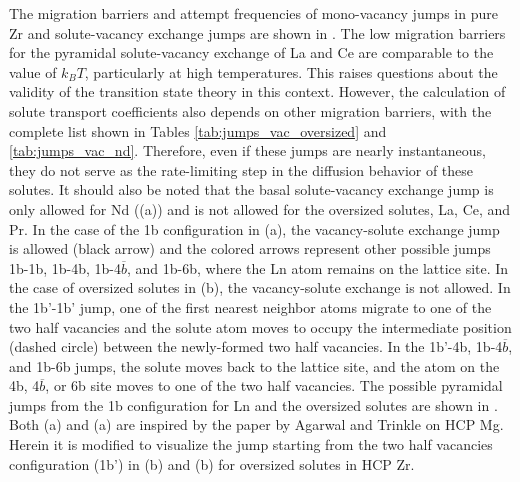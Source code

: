 \documentclass[preprint,12pt]{elsarticle}
\begin{document}
The migration barriers and attempt frequencies of mono-vacancy jumps in pure Zr and solute-vacancy exchange jumps are shown in . 
The low migration barriers for the pyramidal solute-vacancy exchange of La and Ce are comparable to the value of $k_B$$T$, particularly at high temperatures. This raises questions about the validity of the transition state theory in this context. However, the calculation of solute transport coefficients also depends on other migration barriers, with the complete list shown in Tables \ref{tab:jumps_vac_oversized} and \ref{tab:jumps_vac_nd}. Therefore, even if these jumps are nearly instantaneous, they do not serve as the rate-limiting step in the diffusion behavior of these solutes.
It should also be noted that the basal solute-vacancy exchange jump is only allowed for Nd ((a)) and is not allowed for the oversized solutes, La, Ce, and Pr. In the case of the 1b configuration in (a), the vacancy-solute exchange jump is allowed (black arrow) and the colored arrows represent other possible jumps 1b-1b, 1b-4b, 1b-4$\overline{b}$, and 1b-6b, where the Ln atom remains on the lattice site. In the case of oversized solutes in (b), the vacancy-solute exchange is not allowed. In the 1b'-1b' jump, one of the first nearest neighbor atoms migrate to one of the two half vacancies and the solute atom moves to occupy the intermediate position (dashed circle) between the newly-formed two half vacancies. In the 1b'-4b, 1b-4$\overline{b}$, and 1b-6b jumps, the solute moves back to the lattice site, and the atom on the 4b, 4$\overline{b}$, or 6b site moves to one of the two half vacancies. The possible pyramidal jumps from the 1b configuration for Ln and the oversized solutes are shown in . Both (a) and (a) are inspired by the paper by Agarwal and Trinkle \cite{agarwal_exact_2017} on HCP Mg. Herein it is modified to visualize the jump starting from the two half vacancies configuration (1b') in (b) and (b) for oversized solutes in HCP Zr.
\end{document}
